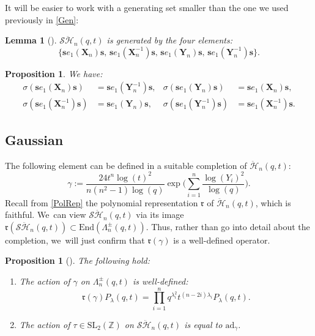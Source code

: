 \documentclass[JEP,XML,SOM,Unicode,published]{cedram}
\newcommand{\SL}{\mathrm{SL}}
\newtheorem{prop}[thm]{Proposition}
\newtheorem{lem}[thm]{Lemma}
\theoremstyle{definition}
\newcommand{\ZZ}{\mathbb{Z}}
\newcommand{\SHH}{\mathcal{S}\ddot{\mathcal{H}}}
\newcommand{\HH}{\ddot{\mathcal{H}}}
\newcommand{\ee}{\boldsymbol{s}}
\newcommand{\rrr}{\mathfrak{r}}
\begin{document}
It will be easier to work with a generating set smaller than the one we used previously in \ref{Gen}:

\begin{lem}[{\cite[Lem.\,5.2]{FFJMM}}]
$\SHH_n(q,t)$ is generated by the four elements:
\[
\bigl\{\ee e_1(\boldsymbol{X}_n)\ee,\,\ee e_1(\boldsymbol{X}_n^{-1})\ee,\,\ee e_1(\boldsymbol{Y}_n)\ee,\,\ee e_1(\boldsymbol{Y}_n^{-1})\ee \bigr\}.
\]
\end{lem}

\begin{prop}
We have:
\begin{align*}
\sigma(\ee e_1(\boldsymbol{X}_n)\ee)&=\ee e_1(\boldsymbol{Y}_n^{-1})\ee, &\sigma(\ee e_1(\boldsymbol{Y}_n)\ee)&=\ee e_1(\boldsymbol{X}_n)\ee,\\
\sigma(\ee e_1(\boldsymbol{X}_n^{-1})\ee)&=\ee e_1(\boldsymbol{Y}_n)\ee, &\sigma(\ee e_1(\boldsymbol{Y}_n^{- 1})\ee)&=\ee e_1(\boldsymbol{X}_n^{-1})\ee.
\end{align*}
\end{prop}

\subsection{Gaussian}
The following element can be defined in a suitable completion of $\HH_n(q,t)$:
\begin{equation*}
\gamma:=\frac{24t^n\log(t)^2}{n(n^2-1)\log(q)}\exp\biggl(\sum_{i=1}^n\frac{\log(Y_i)^2}{\log(q)} \biggr).
\end{equation*}
Recall from \ref{PolRep} the polynomial representation $\rrr$ of $\HH_n(q,t)$, which is faithful. We~can view $\SHH_n(q,t)$ via its image $\rrr(\SHH_n(q,t))\subset\mathrm{End}(\Lambda_n^\pm(q,t))$.
Thus, rather than go into detail about the completion, we~will just confirm that $\rrr(\gamma)$ is a well-defined operator.

\begin{prop}[\cite{DiKedqt}]\label{GaussProp}
The following hold:
\begin{enumerate}
\item The action of $\gamma$ on $\Lambda_n^\pm(q,t)$ is well-defined:
\begin{equation}
\rrr(\gamma)P_\lambda(q,t)=\prod_{i=1}^nq^{\lambda_i^2}t^{(n-2i)\lambda_i}P_\lambda(q,t).
\label{GaussEigen}
\end{equation}
\item The action of $\tau\in \SL_2(\ZZ)$ on $\SHH_n(q,t)$ is equal to $\mathrm{ad}_\gamma$.
\end{enumerate}
\end{prop}
\end{document}
